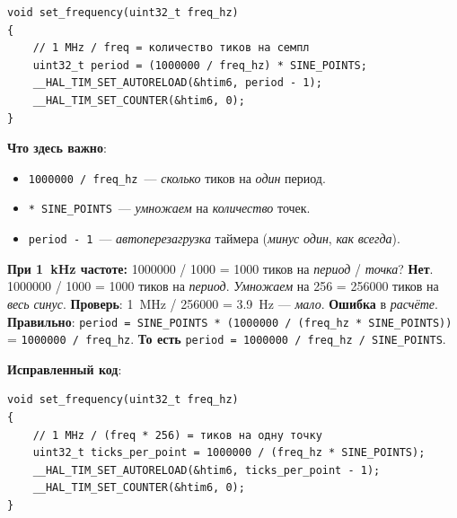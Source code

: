\begin{listing}[htbp]
\begin{verbatim}
void set_frequency(uint32_t freq_hz)
{
    // 1 MHz / freq = количество тиков на семпл
    uint32_t period = (1000000 / freq_hz) * SINE_POINTS;
    __HAL_TIM_SET_AUTORELOAD(&htim6, period - 1);
    __HAL_TIM_SET_COUNTER(&htim6, 0);
}
\end{verbatim}
\caption{\texttt{set\_frequency()}~--- смена частоты}
\label{lst:gen-set-freq}
\end{listing}

\textbf{Что здесь важно}:
\begin{itemize}
    \item \texttt{1000000 / freq\_hz}~--- \emph{сколько}
          тиков на \emph{один} период.
    \item \texttt{* SINE\_POINTS}~--- \emph{умножаем} на
          \emph{количество} точек.
    \item \texttt{period - 1}~--- \emph{автоперезагрузка}
          таймера (\emph{минус} \emph{один}, \emph{как}
          \emph{всегда}).
\end{itemize}

\begin{warnbox}
\textbf{При \SI{1}{\kilo\hertz} частоте:} \num{1000000}
/ \num{1000} = \num{1000} тиков на \emph{период} /
\emph{точка}? \textbf{Нет}. \num{1000000} / \num{1000}
= \num{1000} тиков на \emph{период}. \emph{Умножаем}
на \num{256} = \num{256000} тиков на \emph{весь} \emph{синус}.
\textbf{Проверь}: \SI{1}{\mega\hertz} / \num{256000}
= \SI{3.9}{\hertz} — \emph{мало}. \textbf{Ошибка} в
\emph{расчёте}. \textbf{Правильно}: \texttt{period =
SINE\_POINTS * (1000000 / (freq\_hz * SINE\_POINTS))}
= \texttt{1000000 / freq\_hz}. \textbf{То есть}
\texttt{period = 1000000 / freq\_hz / SINE\_POINTS}.
\end{warnbox}

\textbf{Исправленный код}:

\begin{listing}[htbp]
\begin{verbatim}
void set_frequency(uint32_t freq_hz)
{
    // 1 MHz / (freq * 256) = тиков на одну точку
    uint32_t ticks_per_point = 1000000 / (freq_hz * SINE_POINTS);
    __HAL_TIM_SET_AUTORELOAD(&htim6, ticks_per_point - 1);
    __HAL_TIM_SET_COUNTER(&htim6, 0);
}
\end{verbatim}
\caption{\texttt{set\_frequency()}~--- \emph{исправленная} версия}
\label{lst:gen-set-freq-fixed}
\end{listing}

